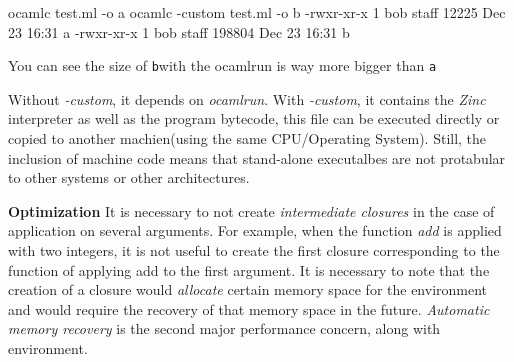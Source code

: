 \begin{bashcode}
ocamlc test.ml -o a
ocamlc -custom test.ml -o b
-rwxr-xr-x   1 bob  staff    12225 Dec 23 16:31 a
-rwxr-xr-x   1 bob  staff   198804 Dec 23 16:31 b
\end{bashcode}
You can see the size of \verb|b|with the ocamlrun is way more bigger
than \verb|a|


Without \textit{-custom}, it depends on \textit{ocamlrun}. With
\textit{-custom}, it contains the \textit{Zinc} interpreter as well as
the program bytecode, this file can be executed directly or copied to
another machien(using the same CPU/Operating System).  Still, the
inclusion of machine code means that stand-alone executalbes are not
protabular to other systems or other architectures.

\textbf{Optimization} It is necessary to not create \textit{intermediate
  closures} in the case of application on several arguments. For
example, when the function \textit{add} is applied with two integers,
it is not useful to create the first closure corresponding to the
function of applying add to the first argument. It is necessary to
note that the creation of a closure would \textit{allocate} certain
memory space for the environment and would require the recovery of
that memory space in the future. \textit{Automatic memory recovery} is
the second major performance concern, along with environment.
